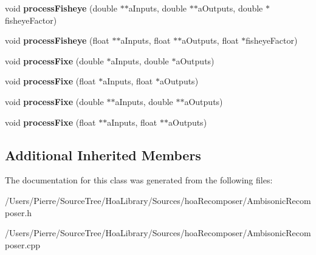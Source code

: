 \begin{DoxyCompactItemize}
\item 
\hypertarget{class_ambisonic_recomposer_a5ee08aa2f171817f67437e232de0d072}{void {\bfseries process\-Fisheye} (double $\ast$$\ast$a\-Inputs, double $\ast$$\ast$a\-Outputs, double $\ast$fisheye\-Factor)}\label{class_ambisonic_recomposer_a5ee08aa2f171817f67437e232de0d072}

\item 
\hypertarget{class_ambisonic_recomposer_a00cfb3935306d4a24f224d67a1b9115f}{void {\bfseries process\-Fisheye} (float $\ast$$\ast$a\-Inputs, float $\ast$$\ast$a\-Outputs, float $\ast$fisheye\-Factor)}\label{class_ambisonic_recomposer_a00cfb3935306d4a24f224d67a1b9115f}

\item 
\hypertarget{class_ambisonic_recomposer_aaa94332c381e597c1ec507aa067b60c6}{void {\bfseries process\-Fixe} (double $\ast$a\-Inputs, double $\ast$a\-Outputs)}\label{class_ambisonic_recomposer_aaa94332c381e597c1ec507aa067b60c6}

\item 
\hypertarget{class_ambisonic_recomposer_a6ce6d60113b002036df1a63075719131}{void {\bfseries process\-Fixe} (float $\ast$a\-Inputs, float $\ast$a\-Outputs)}\label{class_ambisonic_recomposer_a6ce6d60113b002036df1a63075719131}

\item 
\hypertarget{class_ambisonic_recomposer_abf81f7ac4fa459e6398344ce8fed7396}{void {\bfseries process\-Fixe} (double $\ast$$\ast$a\-Inputs, double $\ast$$\ast$a\-Outputs)}\label{class_ambisonic_recomposer_abf81f7ac4fa459e6398344ce8fed7396}

\item 
\hypertarget{class_ambisonic_recomposer_ad2a73e77e696f8eae8f0aef9e919fe8a}{void {\bfseries process\-Fixe} (float $\ast$$\ast$a\-Inputs, float $\ast$$\ast$a\-Outputs)}\label{class_ambisonic_recomposer_ad2a73e77e696f8eae8f0aef9e919fe8a}

\end{DoxyCompactItemize}
\subsection*{Additional Inherited Members}


The documentation for this class was generated from the following files\-:\begin{DoxyCompactItemize}
\item 
/\-Users/\-Pierre/\-Source\-Tree/\-Hoa\-Library/\-Sources/hoa\-Recomposer/Ambisonic\-Recomposer.\-h\item 
/\-Users/\-Pierre/\-Source\-Tree/\-Hoa\-Library/\-Sources/hoa\-Recomposer/Ambisonic\-Recomposer.\-cpp\end{DoxyCompactItemize}
